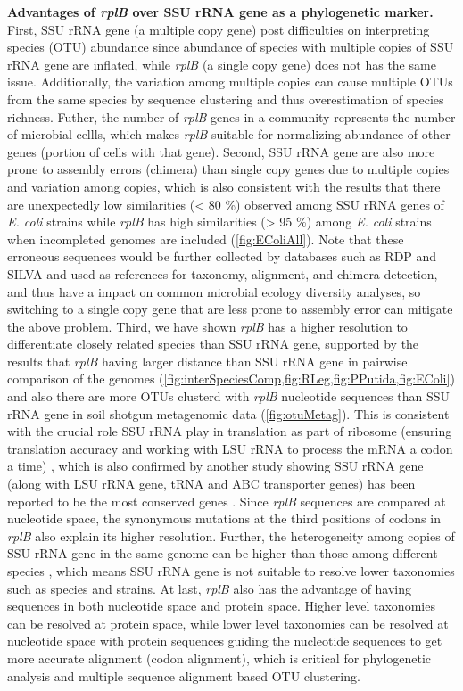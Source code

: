 \documentclass[]{msu-thesis}
\begin{document}
\textbf{Advantages of \textit{rplB} over SSU rRNA gene as a phylogenetic marker. }
First, SSU rRNA gene (a multiple copy gene) post difficulties on interpreting species (OTU) abundance since abundance of species with multiple copies of SSU rRNA gene are inflated, while \textit{rplB} (a single copy gene) does not has the same issue. Additionally, the variation among multiple copies can cause multiple OTUs from the same species by sequence clustering \cite{sun_intragenomic_2013} and thus overestimation of species richness. Futher, the number of \textit{rplB} genes in a community represents the number of microbial cellls, which makes \textit{rplB} suitable for normalizing abundance of other genes (portion of cells with that gene).
Second, SSU rRNA gene are also more prone to assembly errors (chimera) than single copy genes due to multiple copies and variation among copies, which is also consistent with the results that there are unexpectedly low similarities (< 80 \%) observed among SSU rRNA genes of \textit{E. coli} strains while \textit{rplB} has high similarities (> 95 \%) among \textit{E. coli} strains when incompleted genomes are included (\cref{fig:EColiAll}). Note that these erroneous sequences would be further collected by databases such as RDP and SILVA \cite{cole_ribosomal_2014,quast_silva_2013} and used as references for taxonomy, alignment, and chimera detection, and thus have a impact on common microbial ecology diversity analyses, so switching to a single copy gene that are less prone to assembly error can mitigate the above problem.
Third, we have shown \textit{rplB} has a higher resolution to differentiate closely related species than SSU rRNA gene, supported by the results that \textit{rplB} having larger distance than SSU rRNA gene in pairwise comparison of the genomes (\cref{fig:interSpeciesComp,fig:RLeg,fig:PPutida,fig:EColi}) and also there are more OTUs clusterd with \textit{rplB} nucleotide sequences than SSU rRNA gene in soil shotgun metagenomic data (\cref{fig:otuMetag}). This is consistent with the crucial role SSU rRNA play in translation as part of ribosome (ensuring translation accuracy and working with LSU rRNA to process the mRNA a codon a time) \cite{carter_functional_2000}, which is also confirmed by another study showing SSU rRNA gene (along with LSU rRNA gene, tRNA and ABC transporter genes) has been reported to be the most conserved genes \cite{isenbarger_most_2008}. Since \textit{rplB} sequences are compared at nucleotide space, the synonymous mutations at the third positions of codons in \textit{rplB} also explain its higher resolution. Further, the heterogeneity among copies of SSU rRNA gene in the same genome can be higher than those among different species \cite{sun_intragenomic_2013}, which means SSU rRNA gene is not suitable to resolve lower taxonomies such as species and strains.
At last, \textit{rplB} also has the advantage of having sequences in both nucleotide space and protein space. Higher level taxonomies can be resolved at protein space, while lower level taxonomies can be resolved at nucleotide space with protein sequences guiding the nucleotide sequences to get more accurate alignment (codon alignment), which is critical for phylogenetic analysis and multiple sequence alignment based OTU clustering.
\end{document}
